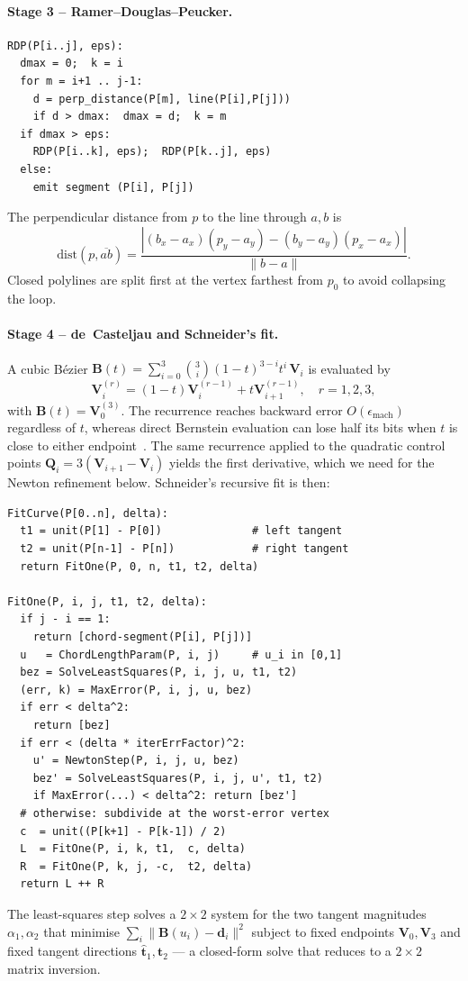 \documentclass[twocolumn,a4paper,10pt]{article}
\begin{document}
\paragraph*{Stage 3 -- Ramer--Douglas--Peucker.}
\begin{lstlisting}[language={}]
RDP(P[i..j], eps):
  dmax = 0;  k = i
  for m = i+1 .. j-1:
    d = perp_distance(P[m], line(P[i],P[j]))
    if d > dmax:  dmax = d;  k = m
  if dmax > eps:
    RDP(P[i..k], eps);  RDP(P[k..j], eps)
  else:
    emit segment (P[i], P[j])
\end{lstlisting}

The perpendicular distance from $p$ to the line through $a,b$ is
\[
\mathrm{dist}(p,\overline{ab})
   = \frac{|(b_x{-}a_x)(p_y{-}a_y){-}(b_y{-}a_y)(p_x{-}a_x)|}{\|b-a\|}.
\]
Closed polylines are split first at the vertex farthest from $p_0$
to avoid collapsing the loop.

\paragraph*{Stage 4 -- de~Casteljau and Schneider's fit.}
A cubic B\'ezier
$\mathbf{B}(t) = \sum_{i=0}^{3} \binom{3}{i}(1{-}t)^{3{-}i} t^i\,\mathbf{V}_i$
is evaluated by
\begin{equation}
\mathbf{V}_i^{(r)}=(1{-}t)\mathbf{V}_i^{(r{-}1)}+t\mathbf{V}_{i+1}^{(r{-}1)},
\quad r=1,2,3,
\label{eq:decast}
\end{equation}
with $\mathbf{B}(t)=\mathbf{V}_0^{(3)}$.  The recurrence reaches
backward error $O(\epsilon_{\text{mach}})$ regardless of $t$,
whereas direct Bernstein evaluation can lose half its bits when $t$
is close to either endpoint~\cite{farouki2012}.  The same recurrence
applied to the quadratic control points $\mathbf{Q}_i = 3(\mathbf{V}_{i+1}-\mathbf{V}_i)$
yields the first derivative, which we need for the Newton refinement
below.  Schneider's recursive fit is then:
\begin{lstlisting}[language={}]
FitCurve(P[0..n], delta):
  t1 = unit(P[1] - P[0])              # left tangent
  t2 = unit(P[n-1] - P[n])            # right tangent
  return FitOne(P, 0, n, t1, t2, delta)

FitOne(P, i, j, t1, t2, delta):
  if j - i == 1:
    return [chord-segment(P[i], P[j])]
  u   = ChordLengthParam(P, i, j)     # u_i in [0,1]
  bez = SolveLeastSquares(P, i, j, u, t1, t2)
  (err, k) = MaxError(P, i, j, u, bez)
  if err < delta^2:
    return [bez]
  if err < (delta * iterErrFactor)^2:
    u' = NewtonStep(P, i, j, u, bez)
    bez' = SolveLeastSquares(P, i, j, u', t1, t2)
    if MaxError(...) < delta^2: return [bez']
  # otherwise: subdivide at the worst-error vertex
  c  = unit((P[k+1] - P[k-1]) / 2)
  L  = FitOne(P, i, k, t1,  c, delta)
  R  = FitOne(P, k, j, -c,  t2, delta)
  return L ++ R
\end{lstlisting}
The least-squares step solves a $2\!\times\!2$ system for the two
tangent magnitudes $\alpha_1, \alpha_2$ that minimise
$\sum_i \|\mathbf{B}(u_i) - \mathbf{d}_i\|^2$ subject to fixed
endpoints $\mathbf{V}_0,\mathbf{V}_3$ and fixed tangent directions
$\hat{\mathbf{t}}_1, \hat{\mathbf{t}}_2$ --- a closed-form solve that
reduces to a $2\!\times\!2$ matrix inversion.
\end{document}
